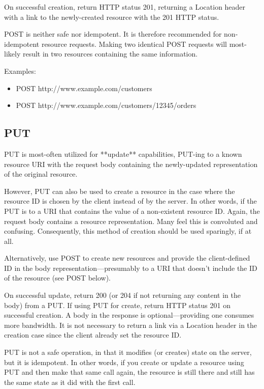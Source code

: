 \documentclass{report}
\begin{document}
	\par On successful creation, return HTTP status 201, returning a Location header with a link to the newly-created resource with the 201 HTTP status.
	
	\par POST is neither safe nor idempotent. It is therefore recommended for non-idempotent resource requests. Making two identical POST requests will most-likely result in two resources containing the same information.
	
	Examples:
	\begin{itemize}	
		\item POST http://www.example.com/customers
		\item POST http://www.example.com/customers/12345/orders
	\end{itemize}
	\subsection{PUT}
	\par PUT is most-often utilized for **update** capabilities, PUT-ing to a known resource URI with the request body containing the newly-updated representation of the original resource.
	
	\par However, PUT can also be used to create a resource in the case where the resource ID is chosen by the client instead of by the server. In other words, if the PUT is to a URI that contains the value of a non-existent resource ID. Again, the request body contains a resource representation. Many feel this is convoluted and confusing. Consequently, this method of creation should be used sparingly, if at all.
	
	\par Alternatively, use POST to create new resources and provide the client-defined ID in the body representation—presumably to a URI that doesn't include the ID of the resource (see POST below).
	
	\par On successful update, return 200 (or 204 if not returning any content in the body) from a PUT. If using PUT for create, return HTTP status 201 on successful creation. A body in the response is optional—providing one consumes more bandwidth. It is not necessary to return a link via a Location header in the creation case since the client already set the resource ID.
	
	\par PUT is not a safe operation, in that it modifies (or creates) state on the server, but it is idempotent. In other words, if you create or update a resource using PUT and then make that same call again, the resource is still there and still has the same state as it did with the first call.
	
\end{document}
